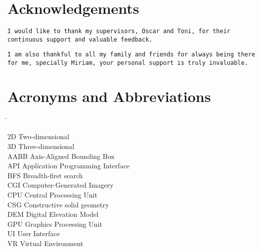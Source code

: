 \chapter*{Acknowledgements}

\texttt{I would like to thank my supervisors, Oscar and Toni, for their continuous support and valuable feedback.}

\vspace{0.5\baselineskip}
\texttt{I am also thankful to all my family and friends for always being there for me, specially Miriam, your personal support is truly invaluable.}



 \setcounter{tocdepth}{4}
 \tableofcontents



\chapter*{Acronyms and Abbreviations}\label{chap:symbole}


\begin{tabbing}
 \hspace*{3.2cm}  \= \kill

2D\> Two-dimensional\\
3D\> Three-dimensional\\
AABB\> Axis-Aligned Bounding Box\\
API\> Application Programming Interface\\
BFS\> Breadth-first search\\
CGI\> Computer-Generated Imagery\\
CPU\> Central Processing Unit\\
CSG\> Constructive solid geometry\\
DEM\> Digital Elevation Model\\
GPU\> Graphics Processing Unit\\
UI\> User Interface\\
VR\> Virtual Environment\\

\end{tabbing}


